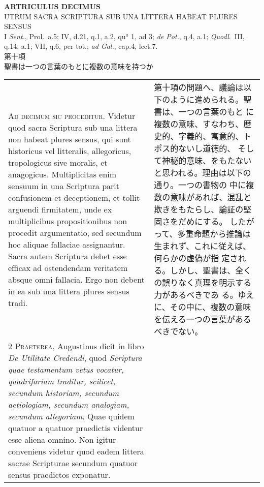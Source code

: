 \documentclass[10pt]{jsarticle}
\begin{document}
\begin{center}
 {\Large {\bf ARTRICULUS DECIMUS}}\\
 {\large UTRUM SACRA SCRIPTURA SUB UNA LITTERA HABEAT PLURES SENSUS}\\
 {\footnotesize I {\itshape Sent.}, Prol.~a.5; IV, d.21, q.1, a.2, qu$^a$ 1, ad 3; {\itshape de Pot.}, q.4, a.1; {\itshape Quodl}.~III, q.14, a.1; VII, q.6, per tot.; {\itshape ad Gal.}, cap.4, lect.7.}\\
 {\Large 第十項\\聖書は一つの言葉のもとに複数の意味を持つか}
\end{center}

\begin{longtable}{p{21em}p{21em}}

{\Huge A}{\scshape d decimum sic proceditur}. Videtur quod sacra
Scriptura sub una littera non habeat plures sensus, qui sunt
historicus vel litteralis, allegoricus, tropologicus sive moralis, et
anagogicus. Multiplicitas enim sensuum in una Scriptura parit
confusionem et deceptionem, et tollit arguendi firmitatem, unde ex
multiplicibus propositionibus non procedit argumentatio, sed secundum
hoc aliquae fallaciae assignantur. Sacra autem Scriptura debet esse
efficax ad ostendendam veritatem absque omni fallacia. Ergo non debent
in ea sub una littera plures sensus tradi.



&

第十項の問題へ、議論は以下のように進められる。聖書は、一つの言葉のもと
に複数の意味、すなわち、歴史的、字義的、寓意的、トポス的ないし道徳的、
そして神秘的意味、をもたないと思われる。理由は以下の通り。一つの書物の
中に複数の意味があれば、混乱と欺きをもたらし、論証の堅固さをだめにする。
したがって、多重命題から推論は生まれず、これに従えば、何らかの虚偽が指
定される。しかし、聖書は、全くの誤りなく真理を明示する力があるべきであ
る。ゆえに、その中に、複数の意味を伝える一つの言葉があるべきでない。


\\


{\scshape 2 Praeterea}, Augustinus dicit in libro {\itshape De
Utilitate Credendi}, quod {\itshape Scriptura quae testamentum vetus
vocatur, quadrifariam traditur, scilicet, secundum historiam, secundum
aetiologiam, secundum analogiam, secundum allegoriam}. Quae quidem
quatuor a quatuor praedictis videntur esse aliena omnino. Non igitur
conveniens videtur quod eadem littera sacrae Scripturae secundum
quatuor sensus praedictos exponatur.




\end{longtable}
\end{document}
